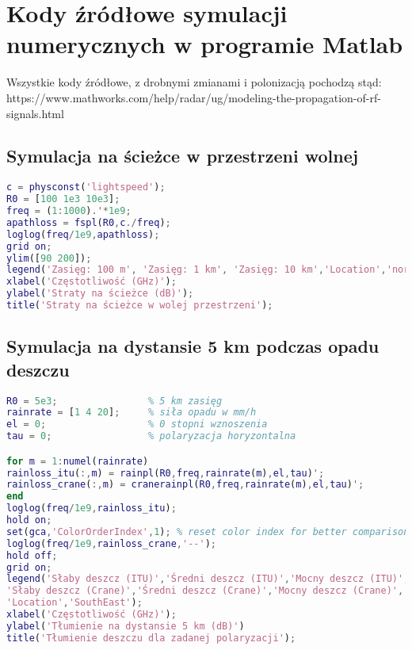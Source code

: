\chapter{Kody źródłowe symulacji numerycznych w programie Matlab}

Wszystkie kody źródłowe, z drobnymi zmianami i polonizacją pochodzą stąd: https://www.mathworks.com/help/radar/ug/modeling-the-propagation-of-rf-signals.html

\section{Symulacja na ścieżce w przestrzeni wolnej}
\begin{lstlisting}[language=matlab, xleftmargin=0pt, backgroundcolor={\color{white}}, caption={}, frame=""]
c = physconst('lightspeed');
R0 = [100 1e3 10e3];
freq = (1:1000).'*1e9;
apathloss = fspl(R0,c./freq);
loglog(freq/1e9,apathloss);
grid on;
ylim([90 200]);
legend('Zasięg: 100 m', 'Zasięg: 1 km', 'Zasięg: 10 km','Location','northwest');
xlabel('Częstotliwość (GHz)');
ylabel('Straty na ścieżce (dB)');
title('Straty na ścieżce w wolej przestrzeni');
\end{lstlisting}

\section{Symulacja na dystansie 5 km podczas opadu deszczu}
\begin{lstlisting}[language=matlab, xleftmargin=0pt, backgroundcolor={\color{white}}, caption={}, frame=""]
R0 = 5e3;                % 5 km zasięg
rainrate = [1 4 20];     % siła opadu w mm/h
el = 0;                  % 0 stopni wznoszenia
tau = 0;                 % polaryzacja horyzontalna

for m = 1:numel(rainrate)
rainloss_itu(:,m) = rainpl(R0,freq,rainrate(m),el,tau)';
rainloss_crane(:,m) = cranerainpl(R0,freq,rainrate(m),el,tau)';
end
loglog(freq/1e9,rainloss_itu);
hold on;
set(gca,'ColorOrderIndex',1); % reset color index for better comparison
loglog(freq/1e9,rainloss_crane,'--');
hold off;
grid on;
legend('Słaby deszcz (ITU)','Średni deszcz (ITU)','Mocny deszcz (ITU)',...
'Słaby deszcz (Crane)','Średni deszcz (Crane)','Mocny deszcz (Crane)', ...
'Location','SouthEast');
xlabel('Częstotliwość (GHz)');
ylabel('Tłumienie na dystansie 5 km (dB)')
title('Tłumienie deszczu dla zadanej polaryzacji');
\end{lstlisting}

